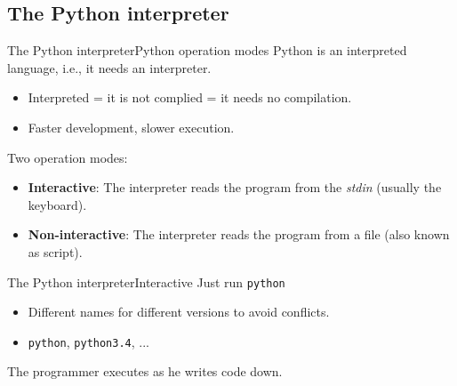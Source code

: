 \documentclass[10pt,compress]{beamer} %
\begin{document}
\subsection{The Python interpreter}

\begin{frame}{The Python interpreter}{Python operation modes}
		Python is an interpreted language, i.e., it needs an interpreter.
			\begin{itemize}
				\item Interpreted = it is not complied = it needs no compilation.
				\item Faster development, slower execution.
			\end{itemize}
		Two operation modes:
			\begin{itemize}
				\item \textbf{Interactive}: The interpreter reads the program from the \textit{stdin} (usually the keyboard).
				\item \textbf{Non-interactive}: The interpreter reads the program from a file (also known as \alert{script}).
			\end{itemize}
\end{frame}

\begin{frame}{The Python interpreter}{Interactive}
		Just run \texttt{python}
			\begin{itemize}
				\item Different names for different versions to avoid conflicts.
				\item \texttt{python}, \texttt{python3.4}, ...
			\end{itemize}

		\vspace{-0.2cm}
		\begin{exampleblock}{}
		\vspace{-0.2cm}
			
		\end{exampleblock}
		The programmer executes as he writes code down.
\end{frame}
\end{document}
